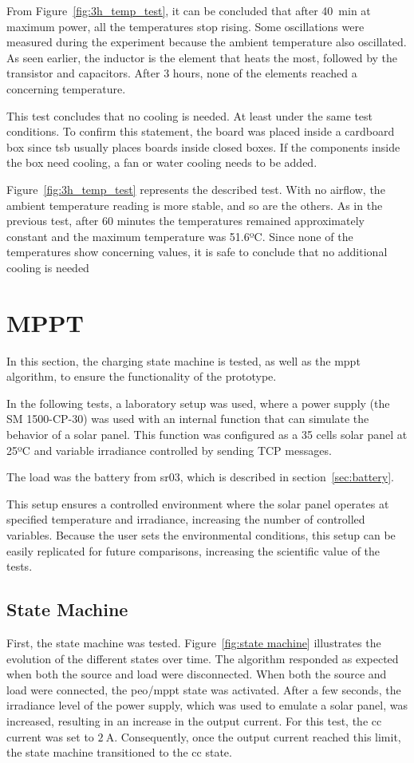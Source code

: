         
        From Figure~\ref{fig:3h_temp_test}, it can be concluded that after 40~min at maximum power, all the temperatures stop rising. Some oscillations were measured during the experiment because the ambient temperature also oscillated. As seen earlier, the inductor is the element that heats the most, followed by the transistor and capacitors. After 3 hours, none of the elements reached a concerning temperature.

        This test concludes that no cooling is needed. At least under the same test conditions. To confirm this statement, the board was placed inside a cardboard box since \ac{tsb} usually places boards inside closed boxes. If the components inside the box need cooling, a fan or water cooling needs to be added.

        Figure~\ref{fig:3h_temp_test} represents the described test. With no airflow, the ambient temperature reading is more stable, and so are the others. As in the previous test, after 60 minutes the temperatures remained approximately constant and the maximum temperature was 51.6ºC. Since none of the temperatures show concerning values, it is safe to conclude that no additional cooling is needed


\section{MPPT}
    In this section, the charging state machine is tested, as well as the \ac{mppt} algorithm, to ensure the functionality of the prototype.

    In the following tests, a laboratory setup was used, where a power supply (the SM 1500-CP-30) was used with an internal function that can simulate the behavior of a solar panel. This function was configured as a 35 cells solar panel at 25ºC and variable irradiance controlled by sending TCP messages. 

    The load was the battery from \ac{sr03}, which is described in section~\ref{sec:battery}.

    This setup ensures a controlled environment where the solar panel operates at specified temperature and irradiance, increasing the number of controlled variables. Because the user sets the environmental conditions, this setup can be easily replicated for future comparisons, increasing the scientific value of the tests.

    \subsection{State Machine}
        First, the state machine was tested. Figure~\ref{fig:state machine} illustrates the evolution of the different states over time. The algorithm responded as expected when both the source and load were disconnected. When both the source and load were connected, the \ac{peo}/\ac{mppt} state was activated. After a few seconds, the irradiance level of the power supply, which was used to emulate a solar panel, was increased, resulting in an increase in the output current. For this test, the \ac{cc} current was set to $2~\mathrm{A}$. Consequently, once the output current reached this limit, the state machine transitioned to the \ac{cc} state.

